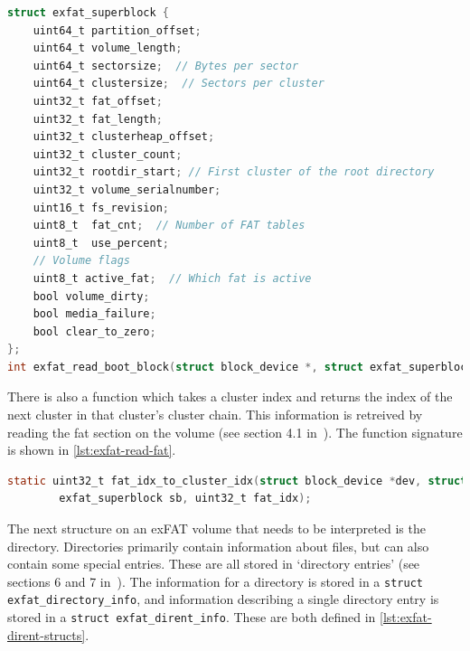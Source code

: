\documentclass{article}
\begin{document}
\begin{lstlisting}[language=C,
                   caption={The structure used to represent the exFAT
                   superblock information, and the declaration of the function
                   used to read it},
                   float,
                   label={lst:exfat-read-superblock}]
struct exfat_superblock {
    uint64_t partition_offset;
    uint64_t volume_length;
    uint64_t sectorsize;  // Bytes per sector
    uint64_t clustersize;  // Sectors per cluster
    uint32_t fat_offset;
    uint32_t fat_length;
    uint32_t clusterheap_offset;
    uint32_t cluster_count;
    uint32_t rootdir_start; // First cluster of the root directory
    uint32_t volume_serialnumber;
    uint16_t fs_revision;
    uint8_t  fat_cnt;  // Number of FAT tables
    uint8_t  use_percent;
    // Volume flags
    uint8_t active_fat;  // Which fat is active
    bool volume_dirty;
    bool media_failure;
    bool clear_to_zero;
};
int exfat_read_boot_block(struct block_device *, struct exfat_superblock *);
\end{lstlisting}

There is also a function which takes a cluster index and returns the index of
the next cluster in that cluster's cluster chain. This information is retreived
by reading the \gls{fat} section on the volume (see section 4.1
in~\cite{exFAT-specs}). The function signature is shown in
\autoref{lst:exfat-read-fat}.

\begin{lstlisting}[language=C,
                   caption={The function which is used to get the cluster index
                   of the next cluster in a cluster chain},
                   float,
                   label={lst:exfat-read-fat}]
static uint32_t fat_idx_to_cluster_idx(struct block_device *dev, struct
        exfat_superblock sb, uint32_t fat_idx);
\end{lstlisting}

The next structure on an exFAT volume that needs to be interpreted is the
directory. Directories primarily contain information about files, but can also
contain some special entries. These are all stored in `directory entries' (see
sections 6 and 7 in~\cite{exFAT-specs}). The information for a directory is
stored in a \verb!struct exfat_directory_info!, and information describing a
single directory entry is stored in a \verb!struct exfat_dirent_info!. These
are both defined in \autoref{lst:exfat-dirent-structs}.
\end{document}
